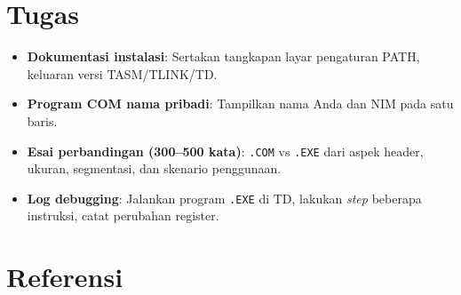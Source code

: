 \section{Tugas}
\begin{itemize}
  \item \textbf{Dokumentasi instalasi}: Sertakan tangkapan layar pengaturan PATH, keluaran versi TASM/TLINK/TD.
  \item \textbf{Program COM nama pribadi}: Tampilkan nama Anda dan NIM pada satu baris.
  \item \textbf{Esai perbandingan (300--500 kata)}: \texttt{.COM} vs \texttt{.EXE} dari aspek header, ukuran, segmentasi, dan skenario penggunaan.
  \item \textbf{Log debugging}: Jalankan program \texttt{.EXE} di TD, lakukan \textit{step} beberapa instruksi, catat perubahan register.
\end{itemize}

\section{Referensi}
